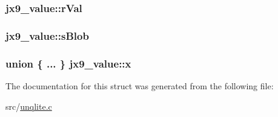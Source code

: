 \hypertarget{structjx9__value_ab77cd0d0af1849fdca1fc9203558f9f6}{
\subsubsection[{r\-Val}]{ jx9\-\_\-value\-::r\-Val}}\label{dc/d7b/structjx9__value_ab77cd0d0af1849fdca1fc9203558f9f6}
\hypertarget{structjx9__value_a02e50657e71231be7ccc35d23dd72276}{
\subsubsection[{s\-Blob}]{ jx9\-\_\-value\-::s\-Blob}}\label{dc/d7b/structjx9__value_a02e50657e71231be7ccc35d23dd72276}
\hypertarget{structjx9__value_ab7b1e3f6dbe52d6519c772c8e7263d63}{
\subsubsection[{x}]{\setlength{\rightskip}{0pt plus 5cm}union \{ ... \}  jx9\-\_\-value\-::x}}\label{dc/d7b/structjx9__value_ab7b1e3f6dbe52d6519c772c8e7263d63}


The documentation for this struct was generated from the following file\-:\begin{DoxyCompactItemize}
\item 
src/\hyperlink{unqlite_8c}{unqlite.\-c}\end{DoxyCompactItemize}
